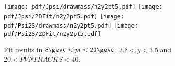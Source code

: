 \begin{figure}[H]
\begin{center}
\texttt{[image: pdf/Jpsi/drawmass/n2y2pt5.pdf]}
\texttt{[image: pdf/Jpsi/2DFit/n2y2pt5.pdf]}
\vspace*{-0.5cm}
\texttt{[image: pdf/Psi2S/drawmass/n2y2pt5.pdf]}
\texttt{[image: pdf/Psi2S/2DFit/n2y2pt5.pdf]}
\vspace*{-0.5cm}
\end{center}
\caption{Fit results in $8\gevc<pt<20\gevc$, $2.8<y<3.5$ and $20<PVNTRACKS<40$.}
\label{Fitn2y2pt5}
\end{figure}
